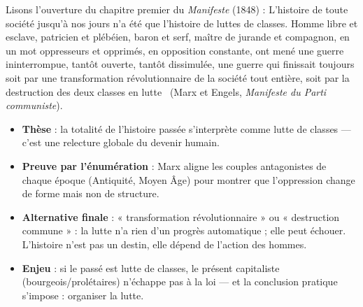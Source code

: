 \documentclass[11pt]{article}
\begin{document}
\begin{experience}
Lisons l'ouverture du chapitre premier du \emph{Manifeste} (1848) : \guillemotleft L'histoire de toute société jusqu'à nos jours n'a été que l'histoire de luttes de classes. Homme libre et esclave, patricien et plébéien, baron et serf, maître de jurande et compagnon, en un mot oppresseurs et opprimés, en opposition constante, ont mené une guerre ininterrompue, tantôt ouverte, tantôt dissimulée, une guerre qui finissait toujours soit par une transformation révolutionnaire de la société tout entière, soit par la destruction des deux classes en lutte \guillemotright\ (Marx et Engels, \emph{Manifeste du Parti communiste}).
\begin{itemize}
\item \textbf{Thèse} : la totalité de l'histoire passée s'interprète comme lutte de classes — c'est une relecture globale du devenir humain.
\item \textbf{Preuve par l'énumération} : Marx aligne les couples antagonistes de chaque époque (Antiquité, Moyen Âge) pour montrer que l'oppression change de forme mais non de structure.
\item \textbf{Alternative finale} : « transformation révolutionnaire » ou « destruction commune » : la lutte n'a rien d'un progrès automatique ; elle peut échouer. L'histoire n'est pas un destin, elle dépend de l'action des hommes.
\item \textbf{Enjeu} : si le passé est lutte de classes, le présent capitaliste (bourgeois/prolétaires) n'échappe pas à la loi — et la conclusion pratique s'impose : organiser la lutte.
\end{itemize}
\end{experience}
\end{document}
